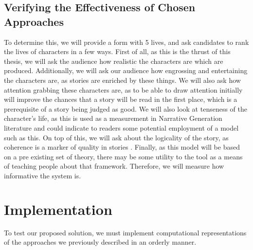 \documentclass[12pt]{article}
\begin{document}
\subsection{Verifying the Effectiveness of Chosen Approaches}
To determine this, we will provide a form with 5 lives, and ask candidates to rank the lives of characters in a few ways. First of all, as this is the thrust of this thesis, we will ask the audience how realistic the characters are which are produced. Additionally, we will ask our audience how engrossing and entertaining the characters are, as stories are enriched by these things. We will also ask how attention grabbing these characters are, as to be able to draw attention initially will improve the chances that a story will be read in the first place, which is a prerequisite of a story being judged as good. We will also look at tenseness of the character's life, as this is used as a measurement in Narrative Generation literature and could indicate to readers some potential employment of a model such as this\cite{questgeneration}. On top of this, we will ask about the logicality of the story, as coherence is a marker of quality in stories \cite{sagarkar-etal-2018-quality}. Finally, as this model will be based on a pre existing set of theory, there may be some utility to the tool as a means of teaching people about that framework. Therefore, we will measure how informative the system is. 

\section{Implementation}
To test our proposed solution, we must implement computational representations of the approaches we previously described in an orderly manner.
\end{document}
